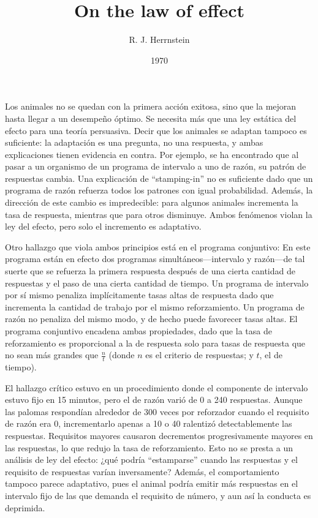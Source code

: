 \documentclass[a4paper,12pt]{article}
\title{On the law of effect}
\author{R. J. Herrnstein}
\date{1970}
\begin{document}
{\scshape\bfseries \maketitle}

Los animales no se quedan con la primera acción exitosa, sino que la mejoran hasta llegar a un desempeño óptimo.
Se necesita más que una ley estática del efecto para una teoría persuasiva.
Decir que los animales se adaptan tampoco es suficiente: la adaptación es una pregunta, no una respuesta, y ambas explicaciones tienen evidencia en contra.
Por ejemplo, se ha encontrado que al pasar a un organismo de un programa de intervalo a uno de razón, su patrón de respuestas cambia.
Una explicación de ``stamping-in'' no es suficiente dado que un programa de razón refuerza todos los patrones con igual probabilidad.
Además, la dirección de este cambio es impredecible: para algunos animales incrementa la tasa de respuesta, mientras que para otros disminuye.
Ambos fenómenos violan la ley del efecto, pero solo el incremento es adaptativo.

Otro hallazgo que viola ambos principios está en el programa conjuntivo:
En este programa están en efecto dos programas simultáneos---intervalo y razón---de tal suerte que se refuerza la primera respuesta después de una cierta cantidad de respuestas y el paso de una cierta cantidad de tiempo.
Un programa de intervalo por sí mismo penaliza implícitamente tasas altas de respuesta dado que incrementa la cantidad de trabajo por el mismo reforzamiento.
Un programa de razón no penaliza del mismo modo, y de hecho puede favorecer tasas altas.
El programa conjuntivo encadena ambas propiedades, dado que la tasa de reforzamiento es proporcional a la de respuesta solo para tasas de respuesta que no sean más grandes que $\frac{n}{t}$ (donde $n$ es el criterio de respuestas; y $t$, el de tiempo).

El hallazgo crítico estuvo en un procedimiento donde el componente de intervalo estuvo fijo en 15 minutos, pero el de razón varió de 0 a 240 respuestas.
Aunque las palomas respondían alrededor de 300 veces por reforzador cuando el requisito de razón era 0, incrementarlo apenas a 10 o 40 ralentizó detectablemente las respuestas.
Requisitos mayores causaron decrementos progresivamente mayores en las respuestas, lo que redujo la tasa de reforzamiento.
Esto no se presta a un análisis de ley del efecto: ¿qué podría ``estamparse'' cuando las respuestas y el requisito de respuestas varían inversamente?
Además, el comportamiento tampoco parece adaptativo, pues el animal podría emitir más respuestas en el intervalo fijo de las que demanda el requisito de número, y aun así la conducta es deprimida.
\end{document}
